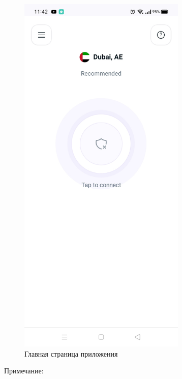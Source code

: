 \begin{itemize}
\begin{figure}[H]
\includegraphics[width=8cm]{35.png}
\centering
\caption{Главная страница приложения}
\label{fig:44}
\end{figure}

Примечание:


\end{itemize}
